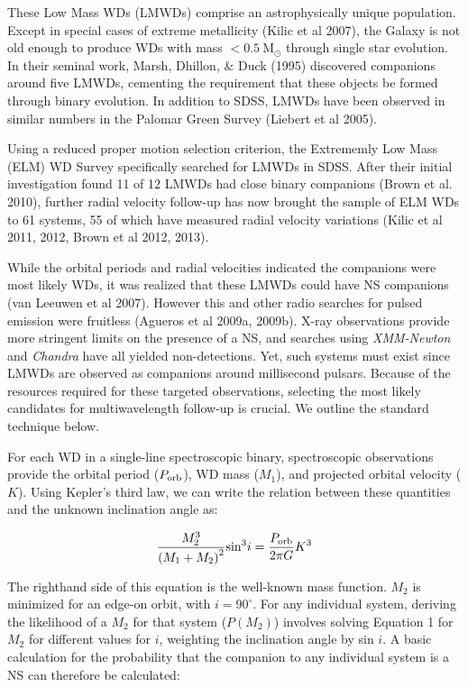 \documentclass[letterpaper,12pt,preprint]{aastex}
\newcommand{\Msun}{\mathrm{M}_\odot}
\begin{document}
These Low Mass WDs (LMWDs) comprise an astrophysically unique population. Except in special cases of extreme metallicity (Kilic et al 2007), the Galaxy is not old enough to produce WDs with mass $<0.5~\Msun$ through single star evolution. In their seminal work, Marsh, Dhillon, \& Duck (1995) discovered companions around five LMWDs, cementing the requirement that these objects be formed through binary evolution. In addition to SDSS, LMWDs have been observed in similar numbers in the Palomar Green Survey (Liebert et al 2005).

Using a reduced proper motion selection criterion, the Extrememly Low Mass (ELM) WD Survey specifically searched for LMWDs in SDSS. After their initial investigation found 11 of 12 LMWDs had close binary companions (Brown et al. 2010), further radial velocity follow-up has now brought the sample of ELM WDs to 61 systems, 55 of which have measured radial velocity variations (Kilic et al 2011, 2012, Brown et al 2012, 2013).


While the orbital periods and radial velocities indicated the companions were most likely WDs, it was realized that these LMWDs could have NS companions (van Leeuwen et al 2007). However this and other radio searches for pulsed emission were fruitless (Agueros et al 2009a, 2009b). X-ray observations provide more stringent limits on the presence of a NS, and searches using {\it XMM-Newton} and {\it Chandra} have all yielded non-detections. Yet, such systems must exist since LMWDs are observed as companions around millisecond pulsars. Because of the resources required for these targeted observations, selecting the most likely candidates for multiwavelength follow-up is crucial. We outline the standard technique below.


For each WD in a single-line spectroscopic binary, spectroscopic observations provide the orbital period ($P_{\rm orb}$), WD mass ($M_1$), and projected orbital velocity ($K$). Using Kepler's third law, we can write the relation between these quantities and the unknown inclination angle as:

\begin{equation}
	\frac{M_2^3}{\left(M_1+M_2\right)^2} {\rm sin}^3 i = \frac{P_{\rm orb}}{2\pi G} K^3 \label{eq:massfunc}
\end{equation}

The righthand side of this equation is the well-known mass function. $M_2$ is minimized for an edge-on orbit, with $i = 90^{\circ}$. For any individual system, deriving the likelihood of a $M_2$ for that system ($P(M_2)$) involves solving Equation 1 for $M_2$ for different values for $i$, weighting the inclination angle by sin $i$. A basic calculation for the probability that the companion to any individual system is a NS can therefore be calculated:
\end{document}
